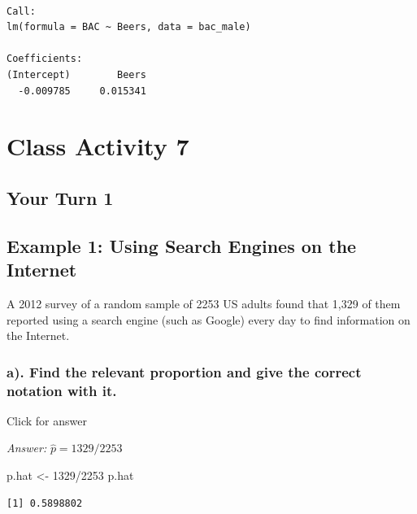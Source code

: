 \documentclass[
]{book}
\newenvironment{Shaded}{\begin{snugshade}}{\end{snugshade}}
\newcommand{\DecValTok}[1]{\textcolor[rgb]{0.00,0.00,0.81}{#1}}
\newcommand{\NormalTok}[1]{#1}
\newcommand{\OtherTok}[1]{\textcolor[rgb]{0.56,0.35,0.01}{#1}}
\newcommand{\SpecialCharTok}[1]{\textcolor[rgb]{0.00,0.00,0.00}{#1}}
\begin{document}
\begin{verbatim}

Call:
lm(formula = BAC ~ Beers, data = bac_male)

Coefficients:
(Intercept)        Beers  
  -0.009785     0.015341  
\end{verbatim}

\hypertarget{class-activity-7}{%
\chapter{Class Activity 7}\label{class-activity-7}}

\hypertarget{your-turn-1-4}{%
\section{Your Turn 1}\label{your-turn-1-4}}

\hypertarget{example-1-using-search-engines-on-the-internet}{%
\section{Example 1: Using Search Engines on the Internet}\label{example-1-using-search-engines-on-the-internet}}

A 2012 survey of a random sample of 2253 US adults found that 1,329 of them reported using a search engine (such as Google) every day to find information on the Internet.

\hypertarget{a.-find-the-relevant-proportion-and-give-the-correct-notation-with-it.}{%
\subsection{a). Find the relevant proportion and give the correct notation with it.}\label{a.-find-the-relevant-proportion-and-give-the-correct-notation-with-it.}}

Click for answer

\emph{Answer:} \(\hat{p} = 1329/2253\)

\begin{Shaded}
\begin{Highlighting}[]
\NormalTok{p.hat }\OtherTok{\textless{}{-}} \DecValTok{1329}\SpecialCharTok{/}\DecValTok{2253}
\NormalTok{p.hat}
\end{Highlighting}
\end{Shaded}

\begin{verbatim}
[1] 0.5898802
\end{verbatim}
\end{document}
